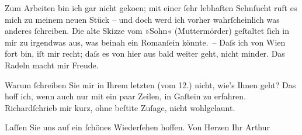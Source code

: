 \pstart
           Zum Arbeiten bin ich gar nicht geko{\geminationm}en; mit einer ſehr
               lebhaften Sehnſucht ruft es mich zu meinem neuen Stück – und doch werd ich vorher wahrſcheinlich was anderes
               ſchreiben. Die alte Skizze vom »Sohn«
               (Muttermörder) geſtaltet ſich in mir zu irgendwas aus, was beinah {\pb}ein Romanſein könnte. – Daſs ich von Wien fort bin, iſt mir recht; daſs es von hier aus bald weiter
               geht, nicht minder. Das Radeln macht mir Freude.\pend
           
\pstart
           Warum ſchreiben Sie mir in Ihrem letzten \introOben{}(vom
                  12.)\introOben{} nicht, wie’s Ihnen geht? Das hoff ich, wenn auch nur mit
               ein paar Zeilen, in Gaſtein zu erfahren. Richardſchrieb mir kurz, ohne beſti{\geminationm}te Zuſage, nicht wohlgelaunt.\pend
           
\pstart
           Laſſen Sie uns auf ein ſchönes Wiederſehen hoffen. Von Herzen Ihr
                  \spacefill\mbox{Arthur}\pend
           \endnumbering{}  
      
